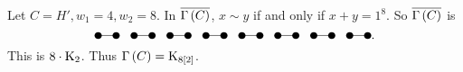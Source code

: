 \begin{example*}
Let $ C = H', w_1 = 4, w_2 = 8 $. In $ \overline{\Gamma\br{C}} $, $ x \sim y $ if and only if $ x + y = 1^8 $. So $ \overline{\Gamma\br{C}} $ is
$$
\begin{tikzpicture}
\fill (0, 0) circle (0.1);
\fill (0.5, 0) circle (0.1);
\fill (1, 0) circle (0.1);
\fill (1.5, 0) circle (0.1);
\fill (2, 0) circle (0.1);
\fill (2.5, 0) circle (0.1);
\fill (3, 0) circle (0.1);
\fill (3.5, 0) circle (0.1);
\fill (4, 0) circle (0.1);
\fill (4.5, 0) circle (0.1);
\fill (5, 0) circle (0.1);
\fill (5.5, 0) circle (0.1);
\fill (6, 0) circle (0.1);
\fill (6.5, 0) circle (0.1);
\fill (7, 0) circle (0.1);
\fill (7.5, 0) circle (0.1);
\draw (0, 0) to (0.5, 0);
\draw (1, 0) to (1.5, 0);
\draw (2, 0) to (2.5, 0);
\draw (3, 0) to (3.5, 0);
\draw (4, 0) to (4.5, 0);
\draw (5, 0) to (5.5, 0);
\draw (6, 0) to (6.5, 0);
\draw (7, 0) to (7.5, 0);
\end{tikzpicture}.
$$
This is $ 8 \cdot \mathrm{K}_2 $. Thus $ \Gamma\br{C} = \K_{8\sbr{2}} $.
\end{example*}

